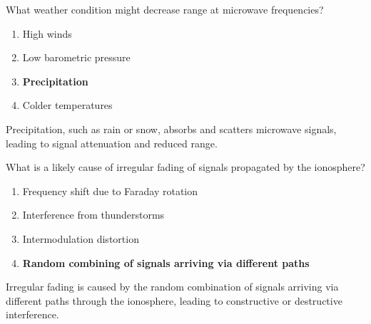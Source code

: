 
\begin{tcolorbox}[colback=gray!10!white,colframe=black!75!black,title={T3A07}]
    What weather condition might decrease range at microwave frequencies?
    \begin{enumerate}[label=\Alph*),noitemsep]
        \item High winds
        \item Low barometric pressure
        \item \textbf{Precipitation}
        \item Colder temperatures
    \end{enumerate}
\end{tcolorbox}
Precipitation, such as rain or snow, absorbs and scatters microwave signals, leading to signal attenuation and reduced range.


\begin{tcolorbox}[colback=gray!10!white,colframe=black!75!black,title={T3A08}]
    What is a likely cause of irregular fading of signals propagated by the ionosphere?
    \begin{enumerate}[label=\Alph*),noitemsep]
        \item Frequency shift due to Faraday rotation
        \item Interference from thunderstorms
        \item Intermodulation distortion
        \item \textbf{Random combining of signals arriving via different paths}
    \end{enumerate}
\end{tcolorbox}
Irregular fading is caused by the random combination of signals arriving via different paths through the ionosphere, leading to constructive or destructive interference.


